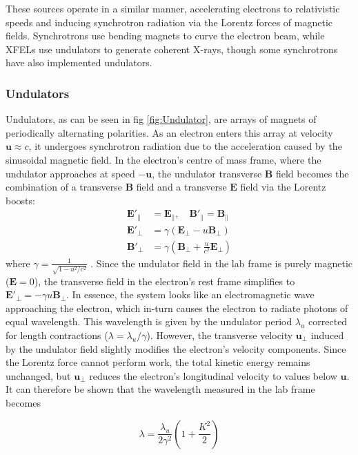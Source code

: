 \documentclass[aps,prb,twocolumn,superscriptaddress]{revtex4-2}
\begin{document}
These sources operate in a similar manner, accelerating
electrons to relativistic speeds and inducing synchrotron radiation via the
Lorentz forces of magnetic fields. Synchrotrons use bending magnets to curve the
electron beam, while XFELs use undulators to generate coherent X-rays, though 
some synchrotrons have also implemented undulators. 

\subsubsection{Undulators}
Undulators, as can be seen in fig \ref{fig:Undulator}, are 
arrays of magnets of periodically alternating polarities. As an electron enters
this array at velocity $\textbf{u} \approx c$, it undergoes synchrotron 
radiation due to the acceleration caused by the sinusoidal magnetic field. In
the electron's centre of mass frame, where the undulator approaches at speed
$-\textbf{u}$, the undulator transverse $\textbf{B}$ field becomes the
combination of a transverse $\textbf{B}$ field and a transverse $\textbf{E}$
field via the Lorentz boosts:
\begin{align}
\mathbf{E}'_{\parallel} &= \mathbf{E}_{\parallel}, \quad \mathbf{B}'_{\parallel} = \mathbf{B}_{\parallel} \\
\mathbf{E}'_{\perp} &= \gamma (\mathbf{E}_{\perp} - u \mathbf{B}_{\perp}) \\
\mathbf{B}'_{\perp} &= \gamma \left( \mathbf{B}_{\perp} + \frac{u}{c^2} \mathbf{E}_{\perp} \right)
\end{align}
where $\gamma = \frac{1}{\sqrt{1 - u^2/c^2}}$ . Since the undulator field in
the lab frame is purely magnetic ($\textbf{E} = 0$), the transverse field in
the electron's rest frame simplifies to $\mathbf{E}'_{\perp} = - \gamma u
\mathbf{B}_{\perp}$. In essence, the system looks like an electromagnetic wave
approaching the electron, which in-turn causes the electron to radiate photons
of equal wavelength. This wavelength is given by the undulator period
$\lambda_u$ corrected for length contractions ($\lambda = \lambda_u/\gamma$).
However, the transverse velocity $\textbf{u}_{\perp}$ induced by the undulator
field slightly modifies the electron’s velocity components. Since the Lorentz
force cannot perform work, the total kinetic energy remains unchanged, but
$\textbf{u}_{\perp}$ reduces the electron’s longitudinal velocity to values
below $\textbf{u}$. It can therefore be shown that the wavelength measured in 
the lab frame becomes

\begin{equation}\label{equation: XFEL wl}
    \lambda = \frac{\lambda_u}{2\gamma^2}\left(1 + \frac{K^2}{2} \right)
\end{equation}
\end{document}
